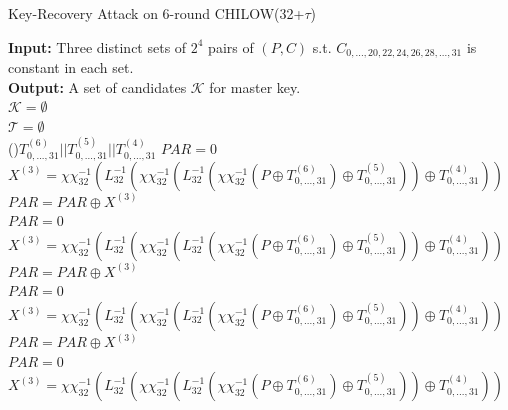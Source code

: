 \documentclass[a4paper]{llncs}
\begin{document}
\begin{algorithm}
\caption{Key-Recovery Attack on 6-round CHILOW(32+$\tau$)}\label{alg}
\LinesNumbered
\SetAlgoLined
  \textbf{Input:} { Three distinct sets of $2^4$ pairs of $(P,C)$ s.t. $C_{0,...,20,22,24,26,28,...,31}$ is constant in each set. }\\
\textbf{Output:} A set of candidates $\mathcal{K}$ for master key.\\
$\mathcal{K}=\emptyset$\\
$\mathcal{T}=\emptyset$\\{}
\ForAll(){$T^{(6)}_{0,...,31}||T^{(5)}_{0,...,31}||T^{(4)}_{0,...,31}$} {
             $PAR=0$\\
              {
                $X^{(3)}=\chi\!\!\!\chi_{32}^{-1}(L_{32}^{-1}(\chi\!\!\!\chi_{32}^{-1}(L_{32}^{-1}(\chi\!\!\!\chi_{32}^{-1}(P\oplus T^{(6)}_{0,...,31}) \oplus T^{(5)}_{0,...,31}))\oplus T^{(4)}_{0,...,31}))$\\
                $PAR=PAR \oplus X^{(3)}$\\
            }
            $PAR=0$\\
              {
                $X^{(3)}=\chi\!\!\!\chi_{32}^{-1}(L_{32}^{-1}(\chi\!\!\!\chi_{32}^{-1}(L_{32}^{-1}(\chi\!\!\!\chi_{32}^{-1}(P\oplus T^{(6)}_{0,...,31}) \oplus T^{(5)}_{0,...,31}))\oplus T^{(4)}_{0,...,31}))$\\
                $PAR=PAR \oplus X^{(3)}$\\}
            $PAR=0$\\
              {
                $X^{(3)}=\chi\!\!\!\chi_{32}^{-1}(L_{32}^{-1}(\chi\!\!\!\chi_{32}^{-1}(L_{32}^{-1}(\chi\!\!\!\chi_{32}^{-1}(P\oplus T^{(6)}_{0,...,31}) \oplus T^{(5)}_{0,...,31}))\oplus T^{(4)}_{0,...,31}))$\\
                $PAR=PAR \oplus X^{(3)}$\\}
            $PAR=0$\\
              {
                $X^{(3)}=\chi\!\!\!\chi_{32}^{-1}(L_{32}^{-1}(\chi\!\!\!\chi_{32}^{-1}(L_{32}^{-1}(\chi\!\!\!\chi_{32}^{-1}(P\oplus T^{(6)}_{0,...,31}) \oplus T^{(5)}_{0,...,31}))\oplus T^{(4)}_{0,...,31}))$\\
}}
\end{algorithm}
\end{document}
